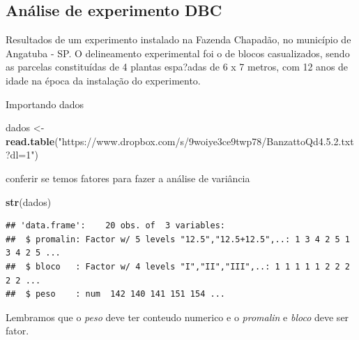 \documentclass[
]{book}
\newenvironment{Shaded}{\begin{snugshade}}{\end{snugshade}}
\newcommand{\KeywordTok}[1]{\textcolor[rgb]{0.13,0.29,0.53}{\textbf{#1}}}
\newcommand{\NormalTok}[1]{#1}
\newcommand{\OperatorTok}[1]{\textcolor[rgb]{0.81,0.36,0.00}{\textbf{#1}}}
\newcommand{\StringTok}[1]{\textcolor[rgb]{0.31,0.60,0.02}{#1}}
\begin{document}
\hypertarget{anuxe1lise-de-experimento-dbc}{%
\subsection{Análise de experimento DBC}\label{anuxe1lise-de-experimento-dbc}}

Resultados de um experimento instalado na Fazenda Chapadão, no município de Angatuba - SP. O delineamento experimental foi o de blocos casualizados, sendo as parcelas constituídas de 4 plantas espa?adas de 6 x 7 metros, com 12 anos de idade na época da instalação do experimento.

Importando dados

\begin{Shaded}
\begin{Highlighting}[]
\NormalTok{dados <-}\StringTok{ }\KeywordTok{read.table}\NormalTok{(}\StringTok{"https://www.dropbox.com/s/9woiye3ce9twp78/BanzattoQd4.5.2.txt?dl=1"}\NormalTok{) }
\end{Highlighting}
\end{Shaded}

conferir se temos fatores para fazer a análise de variância

\begin{Shaded}
\begin{Highlighting}[]
\KeywordTok{str}\NormalTok{(dados)}
\end{Highlighting}
\end{Shaded}

\begin{verbatim}
## 'data.frame':    20 obs. of  3 variables:
##  $ promalin: Factor w/ 5 levels "12.5","12.5+12.5",..: 1 3 4 2 5 1 3 4 2 5 ...
##  $ bloco   : Factor w/ 4 levels "I","II","III",..: 1 1 1 1 1 2 2 2 2 2 ...
##  $ peso    : num  142 140 141 151 154 ...
\end{verbatim}

Lembramos que o \emph{peso} deve ter conteudo numerico e o \emph{promalin} e \emph{bloco} deve ser fator.

\begin{Shaded}
\end{Shaded}
\end{document}
